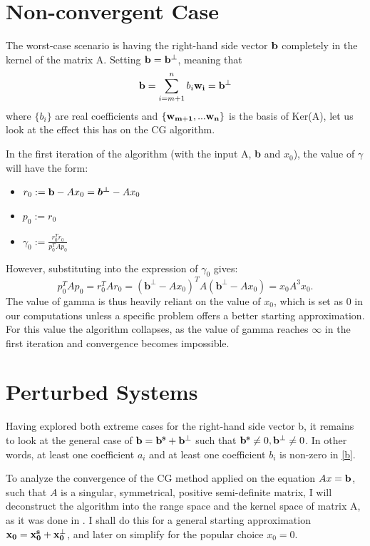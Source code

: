 \section{Non-convergent Case}

The worst-case scenario is having the right-hand side vector \(\bold{b}\) completely in the kernel of the matrix A. Setting \(\bold{b = b^\perp}\), meaning that 
\begin{equation}
    \bold{b} = \sum_{i=m+1}^n{b_i \bold{w_i}} = \bold{b^\perp}
\end{equation}
where \(\{b_i\}\) are real coefficients and \(\bold{\{w_{m+1},...w_n\}}\) is the basis of Ker(A), let us look at the effect this has on the CG algorithm.

In the first iteration of the algorithm (with the input A, \textbf{b} and \(x_0\)), the value of \(\gamma\) will have the form:

\begin{itemize}
    \item \(r_0 := \bold{b} - Ax_0 = \boldsymbol{b^\perp} - Ax_0\)
    \item \(p_0 := r_0\)
    \item \(\gamma_{0} := \frac{r_{0}^Tr_{0}}{p_{0}^TAp_{0}}\)
\end{itemize}

However, substituting into the expression of \(\gamma_{0}\) gives: \begin{equation}
    p_{0}^TAp_{0} = r_{0}^TAr_{0} = (\boldsymbol{b^\perp} - Ax_0)^TA(\boldsymbol{b^\perp} - Ax_0) = x_0A^3x_0.
\end{equation}
    The value of gamma is thus heavily reliant on the value of \(x_0\), which is set as 0 in our computations unless a specific problem offers a better starting approximation. For this value the algorithm collapses, as the value of gamma reaches \(\infty\) in the first iteration and convergence becomes impossible.

\section{Perturbed Systems}

Having explored both extreme cases for the right-hand side vector b, it remains to look at the general case of \(\bold{b = \bold{b^s} + \bold{b^\perp}} \) such that \(\bold{b^s} \neq 0, \bold{b^\perp} \neq 0\). In other words, at least one coefficient \(a_i\) and at least one coefficient \(b_i\) is non-zero in \eqref{b}.

To analyze the convergence of the CG method applied on the equation \(Ax = \bold{b}\), such that \(A\) is a singular, symmetrical, positive semi-definite matrix, I will deconstruct the algorithm into the range space and the kernel space of matrix A, as it was done in \cite{Hayami08}. 
I shall do this for a general starting approximation \(\bold{x_0 = x_0^s + x_0^\perp}\), and later on simplify for the popular choice \(x_0 = 0\).

